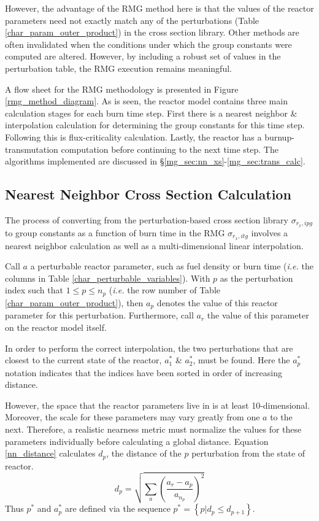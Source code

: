 However, the advantage of the RMG method here is that the values of the reactor parameters
need not exactly match any of the perturbations (Table \ref{char_param_outer_product}) in the 
cross section library.  Other methods are often invalidated when the conditions under which 
the group constants were computed are altered.  However, by including a robust set of values
in the perturbation table, the RMG execution remains meaningful.



A flow sheet for the RMG methodology is presented in Figure \ref{rmg_method_diagram}.  As is
seen, the reactor model contains three main calculation stages for each burn time step.
First there is a nearest neighbor \& interpolation calculation for determining the group
constants for this time step.  Following this is flux-criticality calculation.  Lastly, the reactor
has a burnup-transmutation computation before continuing to the next time step.  The algorithms
implemented are discussed in \S \ref{mg_sec:nn_xs}-\ref{mg_sec:trans_calc}.


\subsection{Nearest Neighbor Cross Section Calculation}
\label{mg_sec:nn_xs}
The process of converting from the perturbation-based cross section library $\sigma_{r_x,ipg}$ to 
group constants as a function of burn time in the RMG $\sigma_{r_x,itg}$ involves a nearest 
neighbor calculation as well as a multi-dimensional linear interpolation.

Call $a$ a perturbable reactor parameter, such as fuel density or burn time (\emph{i.e.} the 
columns in Table \ref{char_perturbable_variables}).   With $p$ as the perturbation index 
such that $1 \le p \le n_p$ (\emph{i.e.} the row number of Table \ref{char_param_outer_product}), 
then $a_p$ denotes the value of this reactor parameter for this perturbation.  Furthermore, call
$a_r$ the value of this parameter on the reactor model itself.

In order to perform the correct interpolation, the two perturbations that are closest to the current
state of the reactor, $a_1^*$ \& $a_2^*$, must be found.  Here the $a_p^*$ notation indicates that 
the indices have been sorted in order of increasing distance.  

However, the space that the reactor parameters live in is at least 10-dimensional.  Moreover, 
the scale for these parameters may vary greatly from one $a$ to the next.  Therefore, a realistic
nearness metric must normalize the values for these parameters individually before calculating a
global distance.  Equation \ref{nn_distance} calculates $d_p$, the distance of the $p$ 
perturbation from the state of reactor.
\begin{equation}
\label{nn_distance}
d_p = \sqrt{\sum_a \left(\frac{a_r - a_p}{a_{n_p}}\right)^2}
\end{equation}
Thus $p^*$ and $a_p^*$ are defined via the sequence $p^* = \left\{p | d_p \le d_{p+1}\right\}$.

